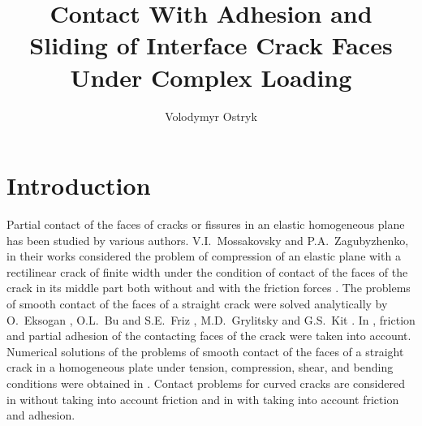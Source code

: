 
\title{Contact With Adhesion and Sliding of Interface Crack Faces Under Complex Loading}


\author{Volodymyr Ostryk}


\graphicspath{{30_Ostryk/}}

\maketitle


\section{Introduction}

Partial contact of the faces of cracks or fissures in an elastic homogeneous plane has been studied by various authors. V.I.~Mossakovsky and P.A.~Zagubyzhenko, in their works \cite{Ostryk1, Ostryk2} considered the problem of compression of an elastic plane with a rectilinear crack of finite width under the condition of contact of the faces of the crack in its middle part both without \cite{Ostryk1} and with the friction forces \cite{Ostryk2}. The problems of smooth contact of the faces of a straight crack were solved analytically by O.~Eksogan \cite{Ostryk3}, O.L.~Bu and S.E.~Friz \cite{Ostryk4}, M.D.~Grylitsky and G.S.~Kit \cite{Ostryk5}. In \cite{Ostryk6}, friction and partial adhesion of the contacting faces of the crack were taken into account. Numerical solutions of the problems of smooth contact of the faces of a straight crack in a homogeneous plate under tension, compression, shear, and bending conditions were obtained in \cite{Ostryk7, Ostryk8, Ostryk9, Ostryk10, Ostryk11, Ostryk12, Ostryk13, Ostryk14, Ostryk15}. Contact problems for curved cracks are considered in \cite{Ostryk16, Ostryk17, Ostryk18, Ostryk19} without taking into account friction and in \cite{Ostryk20, Ostryk21} with taking into account friction and adhesion.

